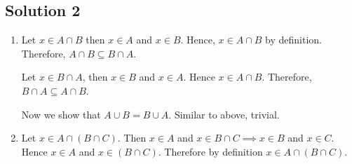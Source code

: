 \subsection{Solution 2}

\begin{enumerate}
  \item Let \( x \in A \cap B \) then \( x \in  A \) and \( x \in  B \).
    Hence, \( x \in  A \cap B \) by definition. Therefore, \( A \cap  B \subseteq B \cap  A \).

    Let \( x \in  B \cap A \), then \( x \in  B \) and \( x \in  A \). Hence \( x \in  A \cap  B \).
    Therefore, \( B \cap A \subseteq A \cap  B \).

    Now we show that \( A \cup  B = B \cup  A \). Similar to above, trivial.

  \item Let \( x \in  A \cap \left(B \cap  C  \right) \). Then \( x \in  A \) and \( x \in B \cap C \implies x \in B \) and \( x \in  C. \) Hence
    \( x \in  A \) and \( x \in  \left( B \cap  C  \right) \). Therefore by definition \( x \in  A \cap \left( B \cap  C \right) \).
\end{enumerate}

